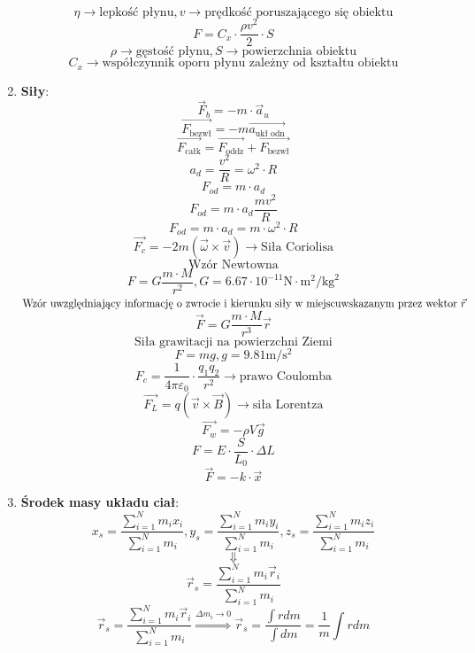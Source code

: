 \documentclass{article}
\begin{document}
\begin{enumerate}
\[		\]
		\[
		\eta \rightarrow \text{lepkość płynu}, v \rightarrow \text{prędkość poruszającego się obiektu}
		\]
		\[
		F = C_x \cdot \frac{\rho v^2}{2} \cdot S
		\]
		\[
		\rho \rightarrow \text{gęstość płynu}, S \rightarrow \text{powierzchnia obiektu}
		\]
		\[
		C_x \rightarrow \text{współczynnik oporu płynu zależny od kształtu obiektu}
		\]
		\item \textbf{Siły}:
		\[
		\vec{F}_b = -m \cdot \vec{a}_u
		\]
		\[
		\overrightarrow{F_{\text{bezwł}}} = -m \overrightarrow{a_{\text{ukł odn}}}
		\]
		\[
		\overrightarrow{F_{\text{całk}}} = \overrightarrow{F_{\text{oddz}}} + \overrightarrow{F_{\text{bezwł}}}
		\]
		\[
		a_d = \frac{v^2}{R} = \omega^2 \cdot R
		\]
		\[
		F_{od} = m \cdot a_d
		\]
		\[
		F_{od} = m \cdot a_d \frac{mv^2}{R}
		\]
		\[
		F_{od} = m \cdot a_d = m \cdot \omega^2 \cdot R
		\]
		\[
		\overrightarrow{F_c} = -2m(\vec{\omega} \times \vec{v}) \longrightarrow \text{Siła Coriolisa}
		\]
		\[
		\text{Wzór Newtowna}
		\]
		\[
		F = G \frac{m \cdot M}{r^2}, G = 6.67 \cdot 10^{-11} \text{N} \cdot \text{m}^2 / \text{kg}^2
		\]
		$
			\text{Wzór uwzględniający informację o zwrocie i kierunku siły w miejscu} 	\newline 
			\text{wskazanym przez wektor } \vec{r}
		$
		\[
		\vec{F} = G \frac{m \cdot M}{r^3} \vec{r}
		\]
		\[
		\text{Siła grawitacji na powierzchni Ziemi}
		\]
		\[
		F = mg, g = 9.81 \text{m} / \text{s}^2 
		\]
		\[
		F_c = \frac{1}{4 \pi \varepsilon_0} \cdot \frac{q_1 q_2}{r^2} \longrightarrow \text{prawo Coulomba}
		\]
		\[
		\overrightarrow{F_L} =  q(\vec{v} \times \vec{B}) \longrightarrow \text{siła Lorentza}
		\]
		\[
		\overrightarrow{F_w} = -\rho V \vec{g}
		\]
		\[
		F = E \cdot \frac{S}{L_0} \cdot \Delta L
		\]
		\[
		\vec{F} = -k \cdot \vec{x}
		\]
		\item \textbf{Środek masy układu ciał}:
		\[
		x_s = \frac{\sum\limits_{i = 1}^N m_ix_i}{\sum\limits_{i = 1}^N m_i},
		y_s = \frac{\sum\limits_{i = 1}^N m_iy_i}{\sum\limits_{i = 1}^N m_i},
		z_s = \frac{\sum\limits_{i = 1}^N m_iz_i}{\sum\limits_{i = 1}^N m_i}
		\]
		\[
		\Downarrow
		\]
		\[
		\vec{r}_s = \frac{\sum\limits_{i = 1}^N m_i \vec{r}_i}{\sum\limits_{i = 1}^N m_i}
		\]
		\[
		\vec{r}_s = \frac{\sum\limits_{i = 1}^N m_i \vec{r}_i}{\sum\limits_{i = 1}^N m_i}
		\overset{\Delta m_i \rightarrow 0}{\Rightarrow}
		 \vec{r}_s = \frac{\int rdm}{\int dm} =
		\frac{1}{m} \int rdm
		\]
		\[
\]
\end{enumerate}
\end{document}
